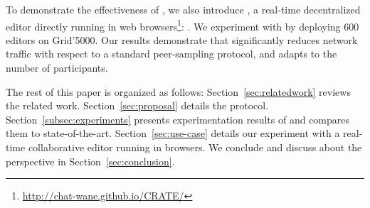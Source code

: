 To demonstrate the effectiveness of \SPRAY, we also introduce \CRATE,
a real-time decentralized editor directly running in web
browsers\footnote{\url{http://chat-wane.github.io/CRATE/}}: . We experiment with \CRATE by
deploying 600 editors on Grid'5000. Our results demonstrate that
\SPRAY significantly reduces network traffic with respect to a
standard peer-sampling protocol, and adapts to the number
of participants.

The rest of this paper is organized as follows:
Section~\ref{sec:relatedwork} reviews the related
work. Section~\ref{sec:proposal} details the \SPRAY
protocol. Section~\ref{subsec:experiments} presents experimentation
results of \SPRAY and compares them to
state-of-the-art. Section~\ref{sec:use-case} details our experiment
with \CRATE a real-time collaborative editor running in browsers. We
conclude and discuss about the perspective in
Section~\ref{sec:conclusion}.

